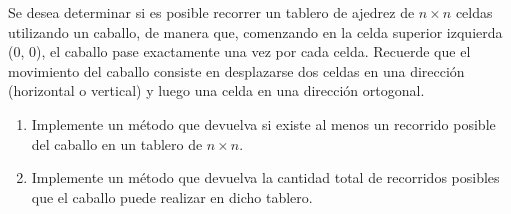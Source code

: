 Se desea determinar si es posible recorrer un tablero de ajedrez de \(n \times n\) celdas utilizando un caballo, de manera que, comenzando en la celda superior izquierda (0, 0), el caballo pase exactamente una vez por cada celda. Recuerde que el movimiento del caballo consiste en desplazarse dos celdas en una dirección (horizontal o vertical) y luego una celda en una dirección ortogonal.

\begin{enumerate}[label=\alph*)]
    \item Implemente un método que devuelva si existe al menos un recorrido posible del caballo en un tablero de \(n \times n\).

    \item Implemente un método que devuelva la cantidad total de recorridos posibles que el caballo puede realizar en dicho tablero.
\end{enumerate}
